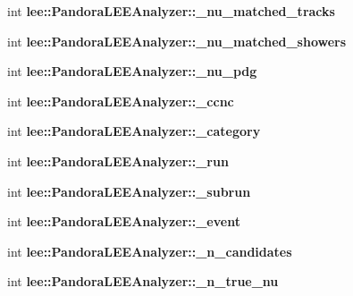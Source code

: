 \begin{DoxyCompactItemize}
\item 
\hypertarget{group__lee_gae2fc3e074f12a2847d68b4e3192c1151}{int {\bfseries lee\-::\-Pandora\-L\-E\-E\-Analyzer\-::\-\_\-nu\-\_\-matched\-\_\-tracks}}\label{group__lee_gae2fc3e074f12a2847d68b4e3192c1151}

\item 
\hypertarget{group__lee_gab254eacbf12abc1ac43236dfd2f7da16}{int {\bfseries lee\-::\-Pandora\-L\-E\-E\-Analyzer\-::\-\_\-nu\-\_\-matched\-\_\-showers}}\label{group__lee_gab254eacbf12abc1ac43236dfd2f7da16}

\item 
\hypertarget{group__lee_gaf5459aca7400b6346a489d293ffea411}{int {\bfseries lee\-::\-Pandora\-L\-E\-E\-Analyzer\-::\-\_\-nu\-\_\-pdg}}\label{group__lee_gaf5459aca7400b6346a489d293ffea411}

\item 
\hypertarget{group__lee_gaae937bb4d388fd91a62a76e251c56c93}{int {\bfseries lee\-::\-Pandora\-L\-E\-E\-Analyzer\-::\-\_\-ccnc}}\label{group__lee_gaae937bb4d388fd91a62a76e251c56c93}

\item 
\hypertarget{group__lee_gac54ac47f84c33553e01edb0419d78570}{int {\bfseries lee\-::\-Pandora\-L\-E\-E\-Analyzer\-::\-\_\-category}}\label{group__lee_gac54ac47f84c33553e01edb0419d78570}

\item 
\hypertarget{group__lee_ga7afce927e448af59dc3f03f6e2fcb911}{int {\bfseries lee\-::\-Pandora\-L\-E\-E\-Analyzer\-::\-\_\-run}}\label{group__lee_ga7afce927e448af59dc3f03f6e2fcb911}

\item 
\hypertarget{group__lee_ga566cffa1b58c7fc0566e696c6c8b8268}{int {\bfseries lee\-::\-Pandora\-L\-E\-E\-Analyzer\-::\-\_\-subrun}}\label{group__lee_ga566cffa1b58c7fc0566e696c6c8b8268}

\item 
\hypertarget{group__lee_gac635405f52f430a32515f06447b98ade}{int {\bfseries lee\-::\-Pandora\-L\-E\-E\-Analyzer\-::\-\_\-event}}\label{group__lee_gac635405f52f430a32515f06447b98ade}

\item 
\hypertarget{group__lee_gab3b7dc079f30897ba737c933e4905b76}{int {\bfseries lee\-::\-Pandora\-L\-E\-E\-Analyzer\-::\-\_\-n\-\_\-candidates}}\label{group__lee_gab3b7dc079f30897ba737c933e4905b76}

\item 
\hypertarget{group__lee_ga4c4794a897538d3307008962f0b96315}{int {\bfseries lee\-::\-Pandora\-L\-E\-E\-Analyzer\-::\-\_\-n\-\_\-true\-\_\-nu}}\label{group__lee_ga4c4794a897538d3307008962f0b96315}


\end{DoxyCompactItemize}
